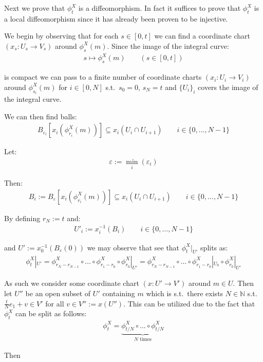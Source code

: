 		Next we prove that $\phi_t^X$ is a diffeomorphism. In fact it suffices to prove that $\phi_t^X$ is a local diffeomorphism since it has already been proven to be injective. \bigskip

		We begin by observing that for each $s \in [0, t]$ we can find a coordinate chart $(x_s : U_s \to V_s)$ around $\phi_s^X(m)$. Since the image of the integral curve:
		\begin{align*}
			s \mapsto \phi_s^X(m) \qquad (s \in [0, t])
		\end{align*}

		is compact we can pass to a finite number of coordinate charts $(x_i : U_i \to V_i)$ around $\phi_{s_i}^X(m)$ for $i \in [0, N]$ s.t.\ $s_0 = 0$, $s_N = t$ and $\{U_i\}_i$ covers the image of the integral curve. \bigskip

		We can then find balls:
		\begin{align*}
			B_{\varepsilon_i}[x_i(\phi_{r_i}^X(m))] \subseteq x_i(U_i \cap U_{i + 1}) \qquad i \in \{0, \ldots, N - 1\}
		\end{align*}

		Let:
		\begin{align*}
			\varepsilon := \min_i(\varepsilon_i)
		\end{align*}

		Then:
		\begin{align*}
			B_i := B_\varepsilon[x_i(\phi_{r_i}^X(m))] \subseteq x_i(U_i \cap U_{i + 1}) \qquad i \in \{0, \ldots, N - 1\}
		\end{align*}

		By defining $r_N := t$ and:
		\begin{align*}
			U'_i := x_i^{-1}(B_i) \qquad i \in \{0, \ldots, N - 1\}
		\end{align*}

		and $U' := x_0^{-1}(B_\varepsilon(0))$ we may observe that see that $\phi_t^X|_{U'}$ splits as:
		\begin{align*}
			\phi_t^X|_{U'} = \phi_{r_N - r_{N - 1}}^X \circ \ldots \circ \phi_{r_1 - r_0}^X \circ \phi_{r_0}^X|_{U'} = \phi_{r_N - r_{N - 1}}^X \circ \ldots \circ \phi_{r_1 - r_0}^X|_{U_0} \circ \phi_{r_0}^X|_{U'}
		\end{align*}



		As such we consider some coordinate chart $(x : U' \to V')$ around $m \in U$. Then let $U''$ be an open subset of $U'$ containing $m$ which is s.t.\ there exists $N \in \mathbb{N}$ s.t.\ $\frac{t}{N}e_1 + v \in V'$ for all $v \in V'' := x(U'')$. This can be utilized due to the fact that $\phi_t^X$ can be split as follows: 
		\begin{align*}
			\phi_t^X = \underbrace{\phi_{t/N}^X \circ \ldots \circ \phi_{t/N}^X}_{\text{$N$ times}}
		\end{align*}

		Then 

